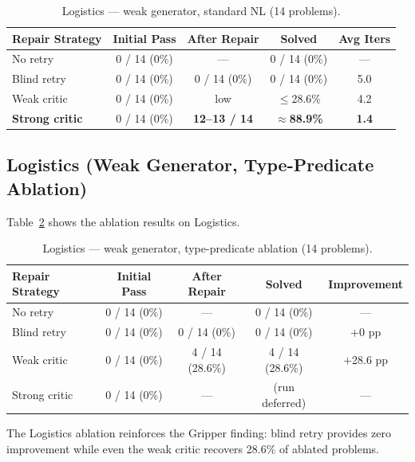 \documentclass{article}
\begin{document}
\begin{table}[h]
\centering
\caption{Logistics --- weak generator, standard NL (14 problems).}
\label{tab:log_weak_std}
\begin{tabular}{lcccc}
\toprule
\textbf{Repair Strategy} & \textbf{Initial Pass} & \textbf{After Repair} & \textbf{Solved} & \textbf{Avg Iters} \\
\midrule
No retry          & 0 / 14 (0\%)  & ---            & 0 / 14 (0\%)    & ---  \\
Blind retry       & 0 / 14 (0\%)  & 0 / 14 (0\%)   & 0 / 14 (0\%)    & 5.0  \\
Weak critic       & 0 / 14 (0\%)  & low            & $\leq$28.6\%    & 4.2  \\
\textbf{Strong critic} & 0 / 14 (0\%) & \textbf{12--13 / 14} & $\approx$\textbf{88.9\%} & \textbf{1.4} \\
\bottomrule
\end{tabular}
\end{table}

\subsection{Logistics (Weak Generator, Type-Predicate Ablation)}
\label{sec:log_weak_mislead}

Table~\ref{tab:log_weak_mislead} shows the ablation results on Logistics.

\begin{table}[h]
\centering
\caption{Logistics --- weak generator, type-predicate ablation (14 problems).}
\label{tab:log_weak_mislead}
\begin{tabular}{lcccc}
\toprule
\textbf{Repair Strategy} & \textbf{Initial Pass} & \textbf{After Repair} & \textbf{Solved} & \textbf{Improvement} \\
\midrule
No retry          & 0 / 14 (0\%)  & ---            & 0 / 14 (0\%)    & ---         \\
Blind retry       & 0 / 14 (0\%)  & 0 / 14 (0\%)   & 0 / 14 (0\%)    & $+$0 pp     \\
Weak critic       & 0 / 14 (0\%)  & 4 / 14 (28.6\%) & 4 / 14 (28.6\%) & $+$28.6 pp \\
Strong critic     & 0 / 14 (0\%)  & ---            & (run deferred)  & ---         \\
\bottomrule
\end{tabular}
\end{table}

The Logistics ablation reinforces the Gripper finding: blind retry provides zero
improvement while even the weak critic recovers 28.6\% of ablated problems.
\end{document}
